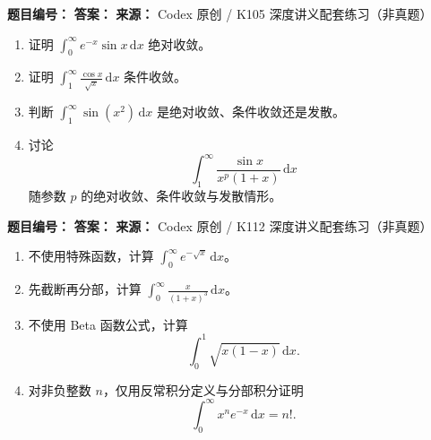 \begin{problemBox}
\begin{problemMeta}
\textbf{题目编号：} \quad
\textbf{答案：} \quad
\textbf{来源：} Codex 原创 / K105 深度讲义配套练习（非真题）
\end{problemMeta}
\begin{enumerate}
  \item[\textbf{A}] 证明
  \(\displaystyle\int_0^\infty e^{-x}\sin x\,\mathrm dx\)
  绝对收敛。
  \item[\textbf{B}] 证明
  \(\displaystyle\int_1^\infty\frac{\cos x}{\sqrt x}\,\mathrm dx\)
  条件收敛。
  \item[\textbf{C}] 判断
  \(\displaystyle\int_1^\infty\sin(x^2)\,\mathrm dx\)
  是绝对收敛、条件收敛还是发散。
  \item[\textbf{M}] 讨论
  \[
  \int_1^\infty
  \frac{\sin x}{x^p(1+x)}\,\mathrm dx
  \]
  随参数 \(p\) 的绝对收敛、条件收敛与发散情形。
\end{enumerate}
\end{problemBox}

\begin{problemBox}
\begin{problemMeta}
\textbf{题目编号：} \quad
\textbf{答案：} \quad
\textbf{来源：} Codex 原创 / K112 深度讲义配套练习（非真题）
\end{problemMeta}
\begin{enumerate}
  \item[\textbf{A}] 不使用特殊函数，计算
  \(\displaystyle\int_0^\infty e^{-\sqrt x}\,\mathrm dx\)。
  \item[\textbf{B}] 先截断再分部，计算
  \(\displaystyle\int_0^\infty\frac{x}{(1+x)^3}\,\mathrm dx\)。
  \item[\textbf{C}] 不使用 Beta 函数公式，计算
  \[
  \int_0^1\sqrt{x(1-x)}\,\mathrm dx.
  \]
  \item[\textbf{M}] 对非负整数 \(n\)，仅用反常积分定义与分部积分证明
  \[
  \int_0^\infty x^ne^{-x}\,\mathrm dx=n!.
  \]
\end{enumerate}
\end{problemBox}
